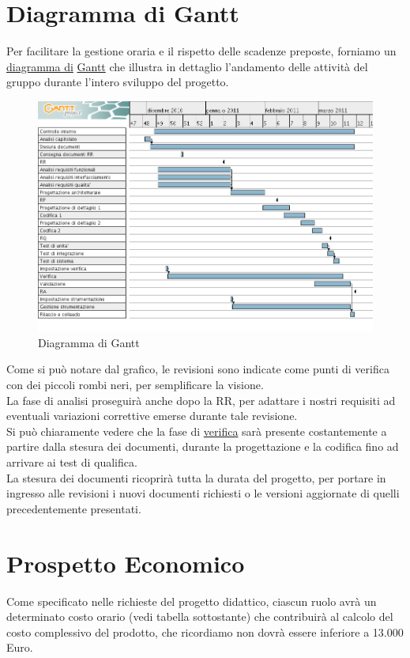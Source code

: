 \section{Diagramma di Gantt}
Per facilitare la gestione oraria e il rispetto delle scadenze preposte,
forniamo un \underline{diagramma di} \underline{Gantt} che illustra in dettaglio
l'andamento delle attivit\`a del gruppo durante l'intero sviluppo del progetto.
\vspace{0.8cm}
\begin{figure}[htbp]
  \centering
  \includegraphics[width=17.2cm, angle=0]{img/PP/gantt.png}
\caption{Diagramma di Gantt}
\end{figure}
\newpage

Come si pu\`o notare dal grafico, le revisioni sono indicate come punti di 
verifica con dei piccoli rombi neri, per semplificare la visione.\\
La fase di analisi proseguir\`a anche dopo la RR, per adattare i nostri
requisiti ad eventuali variazioni correttive emerse durante tale revisione.\\

Si pu\`o chiaramente vedere che la fase di \underline{verifica} sar\`a presente
costantemente a partire dalla stesura dei documenti, durante la progettazione e
la codifica fino ad arrivare ai test di qualifica.\\

La stesura dei documenti ricoprir\`a tutta la durata del progetto, per portare
in ingresso alle revisioni i nuovi documenti richiesti o le versioni aggiornate
di quelli precedentemente presentati.

\section{Prospetto  Economico}
Come specificato nelle richieste del progetto didattico, ciascun ruolo avr\`a un
determinato costo orario (vedi tabella sottostante) che contribuir\`a al calcolo
del costo complessivo del prodotto, che ricordiamo non dovr\`a essere
inferiore a 13.000 Euro.

